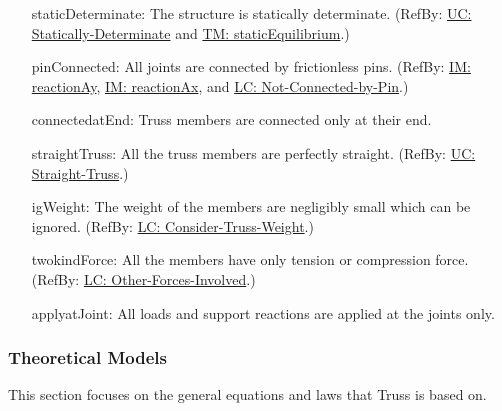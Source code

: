 \documentclass[12pt]{article}
\begin{document}
\begin{itemize}
\item[staticDeterminate:\phantomsection\label{staticDeterminate}]{The structure is statically determinate. (RefBy: \hyperref[unlikeChgStatD]{UC: Statically-Determinate} and \hyperref[TM:staticEquilibrium]{TM: staticEquilibrium}.)}
\item[pinConnected:\phantomsection\label{pinConnected}]{All joints are connected by frictionless pins. (RefBy: \hyperref[IM:reactionAy]{IM: reactionAy}, \hyperref[IM:reactionAx]{IM: reactionAx}, and \hyperref[likeChgNCbP]{LC: Not-Connected-by-Pin}.)}
\item[connectedatEnd:\phantomsection\label{connectedatEnd}]{Truss members are connected only at their end.}
\item[straightTruss:\phantomsection\label{straightTruss}]{All the truss members are perfectly straight. (RefBy: \hyperref[unlikeChgST]{UC: Straight-Truss}.)}
\item[igWeight:\phantomsection\label{igWeight}]{The weight of the members are negligibly small which can be ignored. (RefBy: \hyperref[likeChgWoT]{LC: Consider-Truss-Weight}.)}
\item[twokindForce:\phantomsection\label{twokindForce}]{All the members have only tension or compression force. (RefBy: \hyperref[likeChgOtherF]{LC: Other-Forces-Involved}.)}
\item[applyatJoint:\phantomsection\label{applyatJoint}]{All loads and support reactions are applied at the joints only.}
\end{itemize}
\subsubsection{Theoretical Models}
\label{Sec:TMs}
This section focuses on the general equations and laws that Truss is based on.
\end{document}
